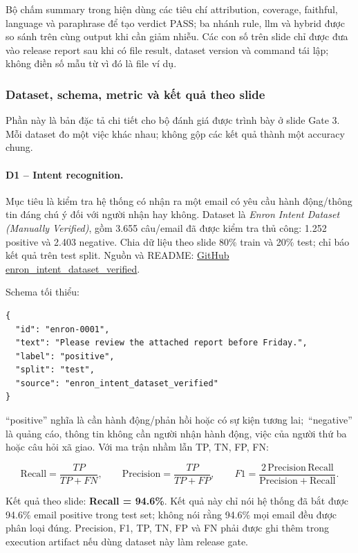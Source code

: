 \documentclass[12pt,a4paper]{article}
\begin{document}
Bộ chấm summary trong  hiện dùng các tiêu
chí attribution, coverage, faithful, language và paraphrase để tạo verdict
PASS; ba nhánh rule, llm và hybrid được so sánh trên cùng output khi cần giảm
nhiễu. Các con số trên slide chỉ được đưa vào release report sau khi có file
result, dataset version và command tái lập; không điền số mẫu từ
 vì đó là file ví dụ.

\subsubsection{Dataset, schema, metric và kết quả theo slide}
Phần này là bản đặc tả chi tiết cho bộ đánh giá được trình bày ở slide Gate 3.
Mỗi dataset đo một việc khác nhau; không gộp các kết quả thành một accuracy
chung.

\paragraph{D1 -- Intent recognition.}
Mục tiêu là kiểm tra hệ thống có nhận ra một email có yêu cầu hành động/thông
tin đáng chú ý đối với người nhận hay không. Dataset là
\emph{Enron Intent Dataset (Manually Verified)}, gồm 3.655 câu/email đã được
kiểm tra thủ công: 1.252 positive và 2.403 negative. Chia dữ liệu theo slide
80\% train và 20\% test; chỉ báo kết quả trên test split. Nguồn và README:
\href{https://github.com/Charlie9/enron_intent_dataset_verified}{GitHub
enron\_intent\_dataset\_verified}.

Schema tối thiểu:

\begin{verbatim}
{
  "id": "enron-0001",
  "text": "Please review the attached report before Friday.",
  "label": "positive",
  "split": "test",
  "source": "enron_intent_dataset_verified"
}
\end{verbatim}

``positive'' nghĩa là cần hành động/phản hồi hoặc có sự kiện tương lai;\,
``negative'' là quảng cáo, thông tin không cần người nhận hành động, việc của
người thứ ba hoặc câu hỏi xã giao. Với ma trận nhầm lẫn TP, TN, FP, FN:

\[
\mathrm{Recall}=\frac{TP}{TP+FN},\qquad
\mathrm{Precision}=\frac{TP}{TP+FP},\qquad
F1=\frac{2\,\mathrm{Precision}\,\mathrm{Recall}}
{\mathrm{Precision}+\mathrm{Recall}}.
\]

Kết quả theo slide: \textbf{Recall = 94.6\%}. Kết quả này chỉ nói hệ thống
đã bắt được 94.6\% email positive trong test set; không nói rằng 94.6\% mọi
email đều được phân loại đúng. Precision, F1, TP, TN, FP và FN phải được ghi
thêm trong execution artifact nếu dùng dataset này làm release gate.
\end{document}
